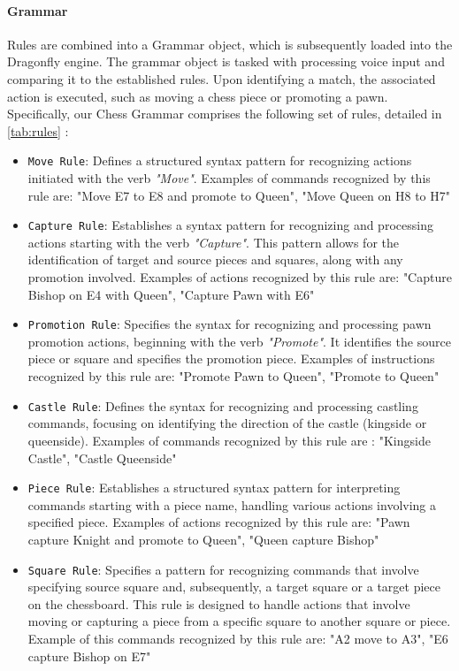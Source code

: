 \documentclass[a4paper, 11pt, twocolumn]{IEEEtran}
\begin{document}
    \paragraph*{Grammar} Rules are combined into a Grammar object, which is subsequently loaded into the Dragonfly engine. The grammar object is tasked with processing voice input and comparing it to the established rules. Upon identifying a match, the associated action is executed, such as moving a chess piece or promoting a pawn. Specifically, our Chess Grammar comprises the following set of rules, detailed in \ref{tab:rules} : 
    \begin{itemize}
        \item \texttt{Move Rule}: Defines a structured syntax pattern for recognizing actions initiated with the verb \emph{"Move"}. Examples of commands recognized by this rule are: "Move E7 to E8 and promote to Queen", "Move Queen on H8 to H7" 
        \item \texttt{Capture Rule}: Establishes a syntax pattern for recognizing and processing actions starting with the verb \emph{"Capture"}. This pattern allows for the identification of target and source pieces and squares, along with any promotion involved. Examples of actions recognized by this rule are: "Capture Bishop on E4 with Queen", "Capture Pawn with E6" 
        \item \texttt{Promotion Rule}: Specifies the syntax for recognizing and processing pawn promotion actions, beginning with the verb \emph{"Promote"}. It identifies the source piece or square and specifies the promotion piece. Examples of instructions recognized by this rule are: "Promote Pawn to Queen", "Promote to Queen"
        \item \texttt{Castle Rule}: Defines the syntax for recognizing and processing castling commands, focusing on identifying the direction of the castle (kingside or queenside). Examples of commands recognized by this rule are : "Kingside Castle", "Castle Queenside"
        \item \texttt{Piece Rule}: Establishes a structured syntax pattern for interpreting commands starting with a piece name, handling various actions involving a specified piece. Examples of actions recognized by this rule are: "Pawn capture Knight and promote to Queen", "Queen capture Bishop"
        \item \texttt{Square Rule}: Specifies a pattern for recognizing commands that involve specifying source square and, subsequently, a target square or a target piece on the chessboard. This rule is designed to handle actions that involve moving or capturing a piece from a specific square to another square or piece. Example of this commands recognized by this rule are: "A2 move to A3", "E6 capture Bishop on E7"
    \end{itemize} 
\end{document}
